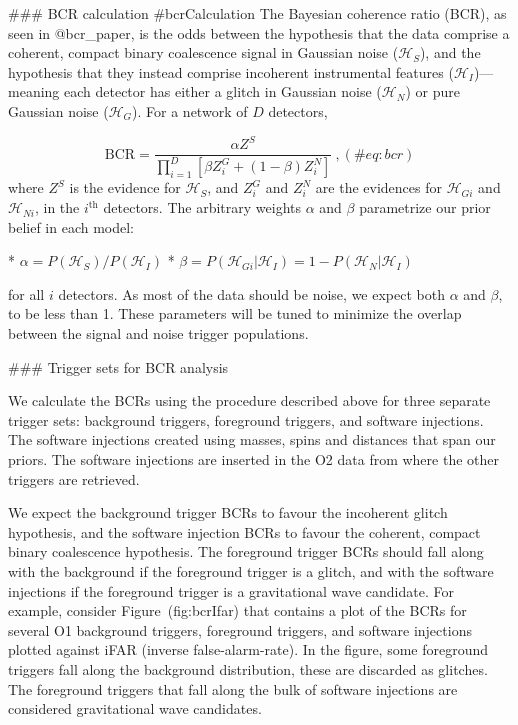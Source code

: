 {{{{{### BCR calculation {#bcrCalculation}
The Bayesian coherence ratio (BCR), as seen in @bcr_paper, is the odds between the hypothesis that the data comprise a
coherent, compact binary coalescence signal in Gaussian noise ($\mathcal{H}_S$), and the hypothesis that they instead
comprise incoherent instrumental features ($\mathcal{H}_I$)—meaning each detector has either a glitch in Gaussian noise
($\mathcal{H}_N$) or pure Gaussian noise ($\mathcal{H}_G$). For a network of $D$ detectors,

\begin{equation}
\mathrm{BCR} = \frac{\alpha Z^{S}}{\prod_{i=1}^{D}\left[\beta Z_{i}^{G}+(1-\beta) Z_{i}^{N}\right]}\ , (\#eq:bcr)
\end{equation}
where $Z^S$	is the evidence for $\mathcal{H}_S$, and $Z^{G}_i$ and
$Z^N_i$ are the evidences for $\mathcal{H}_{Gi}$ and $\mathcal{H}_{Ni}$,
in the $i^{\text{th}}$ detectors. The arbitrary weights $\alpha$ and $\beta$
parametrize our prior belief in each model:

*  $\alpha = P(\mathcal{H}_S)/P(\mathcal{H}_I)$
*  $\beta = P(\mathcal{H}_{Gi}|\mathcal{H}_I)=1-P(\mathcal{H}_{N}|\mathcal{H}_I)$

for all $i$ detectors. As most of the data should be noise, we expect both $\alpha$ and $\beta$, to be less than 1.
These parameters will be tuned to minimize the overlap between the signal and noise trigger populations.

### Trigger sets for BCR analysis

We calculate the BCRs using the procedure described above for three separate trigger sets: background triggers,
foreground triggers, and software injections. The software injections created using masses, spins and distances that
span our priors. The software injections are inserted in the O2 data from where the other triggers are retrieved.

We expect the background trigger BCRs to favour the incoherent glitch hypothesis, and the software injection BCRs to
favour the coherent, compact binary coalescence hypothesis. The foreground trigger BCRs should fall along with the
background if the foreground trigger is a glitch, and with the software injections if the foreground trigger is a
gravitational wave candidate. For example,  consider Figure~\@ref(fig:bcrIfar) that contains a plot of the BCRs for
several O1 background triggers, foreground triggers, and software injections plotted against iFAR (inverse
false-alarm-rate). In the figure, some foreground triggers fall along the background distribution, these are discarded
as glitches. The foreground triggers that fall along the bulk of software injections are considered gravitational wave
candidates.

}}}}}
